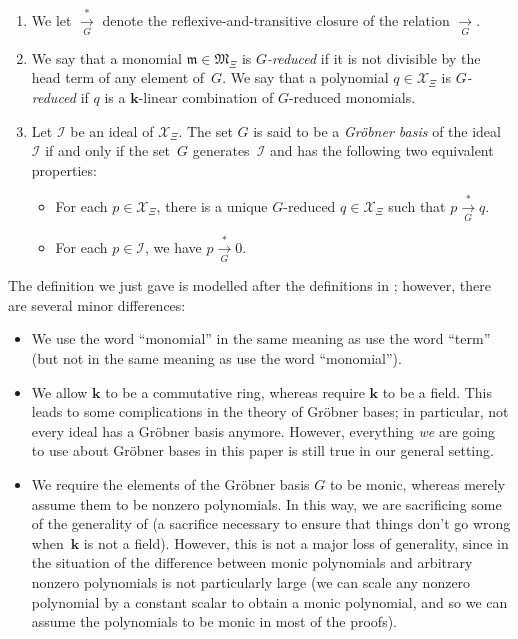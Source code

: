 \documentclass[pdftex]{sigma}
\numberwithin{equation}{section}
\begin{document}
\begin{Definition}
\begin{enumerate}
\item[(i)] We let $\overset{\ast}{\underset{G}{\longrightarrow}}$ denote the reflexive-and-transitive closure of the relation $\underset{G}{\longrightarrow}$.

\item[(j)] We say that a monomial $\mathfrak{m}\in\mathfrak{M}_{\Xi}$ is $G$\textit{-reduced} if it is not divisible by the head term of any element of~$G$.
We say that a polynomial $q\in\mathcal{X}_{\Xi}$ is $G$\textit{-reduced} if $q$ is a $\mathbf{k}$-linear combination of $G$-reduced monomials.

\item[(k)] Let $\mathcal{I}$ be an ideal of $\mathcal{X}_{\Xi}$. The set $G$ is said to be a \textit{Gr\"{o}bner basis} of the ideal $\mathcal{I}$ if and only if the set~$G$ generates~$\mathcal{I}$ and has the following two
equivalent properties:

\begin{itemize}\itemsep=0pt
\item For each $p\in\mathcal{X}_{\Xi}$, there is a unique $G$-reduced $q\in\mathcal{X}_{\Xi}$ such that $p\overset{\ast}{\underset{G}{\longrightarrow}}q$.
\item For each $p\in\mathcal{I}$, we have $p\overset{\ast}{\underset{G}{\longrightarrow}}0$.
\end{itemize}
\end{enumerate}
\end{Definition}

The definition we just gave is modelled after the definitions in \cite[Chapter~5]{BecWei98}; however, there are several minor differences:
\begin{itemize}\itemsep=0pt
\item We use the word ``monomial'' in the same meaning as \cite[Chapter 5]{BecWei98} use the word ``term'' (but not in the same meaning as \cite[Chapter~5]{BecWei98} use the word ``monomial'').

\item We allow $\mathbf{k}$ to be a commutative ring, whereas \cite[Chapter~5]{BecWei98} require $\mathbf{k}$ to be a field. This leads to some complications in the theory of Gr\"{o}bner bases; in particular, not every ideal has a Gr\"{o}bner basis anymore. However, everything \textit{we} are going to use about Gr\"{o}bner bases in this paper is still true in our general setting.

\item We require the elements of the Gr\"{o}bner basis $G$ to be monic, whereas \cite[Chapter~5]{BecWei98} me\-rely assume them to be nonzero polynomials. In this way, we are sacrificing some of the generality of \cite[Chapter~5]{BecWei98} (a sacrifice necessary to ensure that things don't go wrong when~$\mathbf{k}$ is not a field). However, this is not a major loss of generality, since in the situation of \cite[Chapter~5]{BecWei98} the difference between monic polynomials and arbitrary nonzero polynomials is not particularly large (we can scale any nonzero polynomial by a constant scalar to obtain a monic polynomial, and so we can assume the polynomials to be monic in most of the proofs).
\end{itemize}
\end{document}
